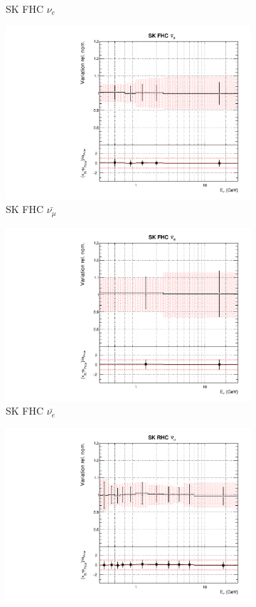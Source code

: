 \begin{figure}
\begin{subfigure}{0.24\textwidth}
  \caption{SK FHC $\nu_e$}
  \label{fig:}
\end{subfigure}
\begin{subfigure}{0.24\textwidth}
  \centering
  \includegraphics[width=0.95\linewidth]{figs/asmvflux10}
  \caption{SK FHC $\bar{\nu_{\mu}}$}
  \label{fig:}
\end{subfigure}
\begin{subfigure}{0.24\textwidth}
  \centering
  \includegraphics[width=0.95\linewidth]{figs/asmvflux11}
  \caption{SK FHC $\bar{\nu_{e}}$}
  \label{fig:}
\end{subfigure}
\begin{subfigure}{0.24\textwidth}
  \centering
  \includegraphics[width=0.95\linewidth]{figs/asmvflux12}

\end{subfigure}
\end{figure}
